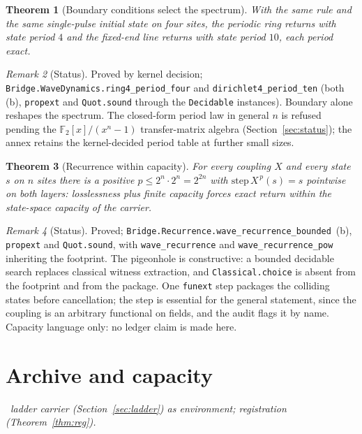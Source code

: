 \documentclass[11pt,a4paper]{article}
\theoremstyle{plain}
\newtheorem{theorem}{Theorem}[section]
\theoremstyle{definition}
\theoremstyle{remark}
\newtheorem{remark}[theorem]{Remark}
\newcommand{\dep}[1]{%
  \par\noindent{\small\color{muted}\sffamily Dependence:}~\textit{#1}\par\medskip}
\begin{document}
\begin{theorem}[Boundary conditions select the spectrum]
\label{thm:spectrumbc}
With the same rule and the same single-pulse initial state on four
sites, the periodic ring returns with state period $4$ and the
fixed-end line returns with state period $10$, each period exact.
\end{theorem}

\begin{remark}[Status]
Proved by kernel decision;
\texttt{Bridge.WaveDynamics.ring4\_period\_four} and
\texttt{dirichlet4\_period\_ten} (both (b), \texttt{propext} and
\texttt{Quot.sound} through the \texttt{Decidable} instances).
Boundary alone reshapes the spectrum. The closed-form period law in
general $n$ is refused pending the $\mathbb{F}_2[x]/(x^n-1)$
transfer-matrix algebra (Section~\ref{sec:status}); the annex retains
the kernel-decided period table at further small sizes.
\end{remark}

\begin{theorem}[Recurrence within capacity]
\label{thm:recur}
For every coupling $X$ and every state $s$ on $n$ sites there is a
positive $p\le 2^n\cdot 2^n = 2^{2n}$ with
$\mathrm{step}\,X^{\,p}(s)=s$ pointwise on both layers: losslessness
plus finite capacity forces exact return within the state-space
capacity of the carrier.
\end{theorem}

\begin{remark}[Status]
Proved; \texttt{Bridge.Recurrence.wave\_recurrence\_bounded}~(b),
\texttt{propext} and \texttt{Quot.sound}, with
\texttt{wave\_recurrence} and \texttt{wave\_recurrence\_pow}
inheriting the footprint. The pigeonhole is constructive: a bounded
decidable search replaces classical witness extraction, and
\texttt{Classical.choice} is absent from the footprint and from the
package. One \texttt{funext} step packages the colliding states
before cancellation; the step is essential for the general statement,
since the coupling is an arbitrary functional on fields, and the audit
flags it by name. Capacity language only: no ledger claim is made
here.
\end{remark}


\section{Archive and capacity}
\label{sec:archive}

\dep{ladder carrier (Section~\ref{sec:ladder}) as environment;
registration (Theorem~\ref{thm:reg}).}
\end{document}
